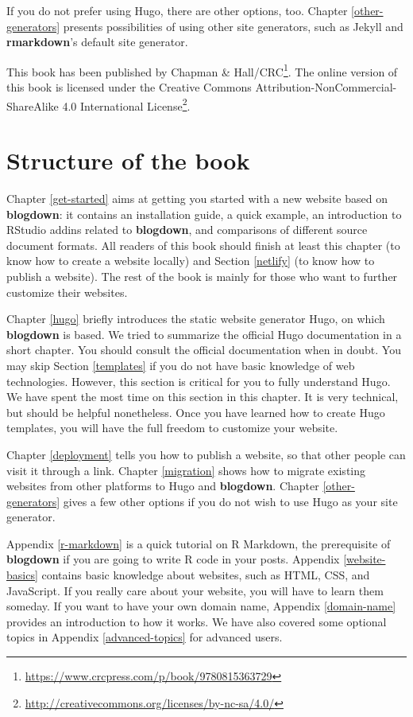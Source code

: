 \documentclass[12pt,]{krantz}
\renewcommand{\href}[2]{#2\footnote{\url{#1}}}
\theoremstyle{definition}
\theoremstyle{definition}
\theoremstyle{definition}
\theoremstyle{remark}
\begin{document}
If you do not prefer using Hugo, there are other options, too. Chapter
\ref{other-generators} presents possibilities of using other site
generators, such as Jekyll and \textbf{rmarkdown}'s default site
generator.

This book has been published by
\href{https://www.crcpress.com/p/book/9780815363729}{Chapman \&
Hall/CRC}. The online version of this book is licensed under the
\href{http://creativecommons.org/licenses/by-nc-sa/4.0/}{Creative
Commons Attribution-NonCommercial-ShareAlike 4.0 International License}.

\section*{Structure of the book}\label{structure-of-the-book}


Chapter \ref{get-started} aims at getting you started with a new website
based on \textbf{blogdown}: it contains an installation guide, a quick
example, an introduction to RStudio addins related to \textbf{blogdown},
and comparisons of different source document formats. All readers of
this book should finish at least this chapter (to know how to create a
website locally) and Section \ref{netlify} (to know how to publish a
website). The rest of the book is mainly for those who want to further
customize their websites.

Chapter \ref{hugo} briefly introduces the static website generator Hugo,
on which \textbf{blogdown} is based. We tried to summarize the official
Hugo documentation in a short chapter. You should consult the official
documentation when in doubt. You may skip Section \ref{templates} if you
do not have basic knowledge of web technologies. However, this section
is critical for you to fully understand Hugo. We have spent the most
time on this section in this chapter. It is very technical, but should
be helpful nonetheless. Once you have learned how to create Hugo
templates, you will have the full freedom to customize your website.

Chapter \ref{deployment} tells you how to publish a website, so that
other people can visit it through a link. Chapter \ref{migration} shows
how to migrate existing websites from other platforms to Hugo and
\textbf{blogdown}. Chapter \ref{other-generators} gives a few other
options if you do not wish to use Hugo as your site generator.

Appendix \ref{r-markdown} is a quick tutorial on R Markdown, the
prerequisite of \textbf{blogdown} if you are going to write R code in
your posts. Appendix \ref{website-basics} contains basic knowledge about
websites, such as HTML, CSS, and JavaScript. If you really care about
your website, you will have to learn them someday. If you want to have
your own domain name, Appendix \ref{domain-name} provides an
introduction to how it works. We have also covered some optional topics
in Appendix \ref{advanced-topics} for advanced users.
\end{document}
